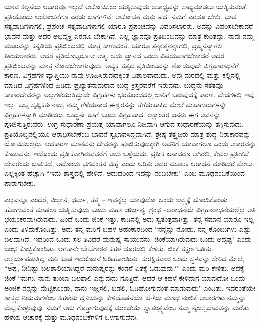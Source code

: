 ಯಾವ ಕಲ್ಪನೆಯ ಆಧಾರವೂ ಇಲ್ಲದೆ ಆಲೋಚಿಸಲು ಯತ್ನಿಸುವುದು ಅಸಾಧ್ಯವನ್ನು ಸಾಧ್ಯಮಾಡಲು ಯತ್ನಿಸುವಂತೆ. ಪ್ರತಿಯೊಂದು ಆಲೋಚನೆಗೂ ಎರಡು ಭಾಗಗಳಿವೆ: ಆಲೋಚನೆ ಮತ್ತು ಪದ. ನಮಗೆ ಎರಡೂ ಬೇಕು. ಭಾವ ಸತ್ಯವಾದಿಗಳಾಗಲಿ, ಪ್ರಪಂಚ–ಸತ್ಯವಾದಿಗಳಾಗಲಿ ಯಾರೂ ಪ್ರಪಂಚವನ್ನು ವಿವರಿಸಲಾರರು. ಅದನ್ನು ವಿವರಿಸಬೇಕಾದರೆ ಭಾವನೆ ಮತ್ತು ಅದರ ಅಭಿವ್ಯಕ್ತಿ ಎರಡೂ ಬೇಕಾಗಿವೆ. ಎಲ್ಲ ಜ್ಞಾನವೂ ಪ್ರತಿಬಿಂಬವನ್ನು ಮಾತ್ರ ಕುರಿತದ್ದು, ನಾವು ನಮ್ಮ ಮುಖವನ್ನು ಕನ್ನಡಿಯ ಪ್ರತಿಬಿಂಬದಲ್ಲಿ ಮಾತ್ರ ಕಾಣುವಂತೆ. ಯಾರೂ ತನ್ನಾತ್ಮನನ್ನಾಗಲಿ, ಬ್ರಹ್ಮನನ್ನಾಗಲಿ ತಿಳಿಯಲಾರರು. ಆದರೆ ಪ್ರತಿಯೊಬ್ಬರೂ ಆ ಆತ್ಮ. ಅದು ಜ್ಞಾನದ ಒಂದು ವಿಷಯವಾಗಬೇಕಾದರೆ ಅದರ ಪ್ರತಿಬಿಂಬವನ್ನು ಮಾತ್ರ ನೋಡಬೇಕಾಗುವುದು. ಅವ್ಯಕ್ತ ತತ್ವದ ಪ್ರತಿಬಿಂಬವನ್ನು ನೋಡುವುದೇ ವಿಗ್ರಹಾರಾಧನೆಗೆ ಕಾರಣ. ವಿಗ್ರಹಗಳ ವ್ಯಾಪ್ತಿಯು ನಾವು ಊಹಿಸಿರುವುದಕ್ಕಿಂತ ವಿಶಾಲವಾದುದು. ಅವು ಮರದಲ್ಲಿ ಮತ್ತು ಕಲ್ಲಿನಲ್ಲಿ ಮಾಡಿದ ವಿಗ್ರಹಗಳಿಂದ ಹಿಡಿದು ಪ್ರಖ್ಯಾತನಾಮರಾದ ಬುದ್ಧ ಕ್ರಿಸ್ತರವರೆಗೆ ಇರುವುವು. ಬುದ್ಧನು ಸತತವೂ ಸಾಕಾರದೇವರನ್ನು ಅಲ್ಲಗಳೆಯುತ್ತಿದ್ದುದೇ ವಿಗ್ರಹಗಳು ಭರತಖಂಡದಲ್ಲಿ ಜಾರಿಗೆ ಬರುವುದಕ್ಕೆ ಕಾರಣ. ವೇದಗಳಲ್ಲಿ ಇವು ಇಲ್ಲ. ಒಬ್ಬ ಸೃಷ್ಟಿಕರ್ತನಾದ, ನಮ್ಮ ಗೆಳೆಯನಾದ ಈಶ್ವರನನ್ನು ತೆಗೆದುಹಾಕಿದ ಮೇಲೆ ಮಹಾಗುರುಗಳನ್ನೇ ವಿಗ್ರಹಗಳನ್ನಾಗಿ ಮಾಡಿದರು. ಬುದ್ಧನೇ ಹಾಗೆ ಒಂದು ವಿಗ್ರಹವಾದ. ಲಕ್ಷಾಂತರ ಜನರು ಈಗ ಅವನನ್ನು ಪೂಜಿಸುತ್ತಿರುವರು. ಉಗ್ರ ಸುಧಾರಣಾ ಪ್ರಯತ್ನ ಯಾವಾಗಲೂ ನಿಜವಾಗಿ ಆಗುವ ಸುಧಾರಣೆಯನ್ನು ತಗ್ಗಿಸುವುದು. ಪ್ರತಿಯೊಬ್ಬನಲ್ಲಿಯೂ ಆರಾಧಿಸಬೇಕೆಂಬ ಭಾವನೆ ಸ್ವಭಾವಸಿದ್ಧವಾಗಿದೆ. ಶ್ರೇಷ್ಠ ತತ್ತ್ವಜ್ಞರು ಮಾತ್ರ ಶುದ್ಧ ನಿರಾಕಾರವನ್ನು ಯೋಚಿಸಬಲ್ಲರು. ಆದಕಾರಣ ಮಾನವನು ದೇವರನ್ನು ಪೂಜಿಸುವುದಕ್ಕಾಗಿ ಅವನಿಗೆ ಯಾವಾಗಲೂ ಒಂದು ಆಕಾರವನ್ನು ಕೊಡುವನು. ಇದೊಂದು ಪ್ರತೀಕವಾಗಿರುವವರೆಗೆ ಅದು ಒಳ್ಳೆಯದು. ಪ್ರತೀಕ ಏನಾದರೂ ಆಗಿರಲಿ, ಕೇವಲ ಪ್ರತೀಕವೆ ದೇವರೆಂದು ಭಾವಿಸದೆ, ಅದೊಂದು ಭಗವಂತನ ಚಿಹ್ನೆ ಎಂದು ಅರಿತು ಅದರ ಮೂಲಕ ಆರಾಧನೆ ಮಾಡಿದರೆ ಮೇಲು. ಎಲ್ಲಕ್ಕಿಂತ ಹೆಚ್ಚಾಗಿ “ಇದು ಶಾಸ್ತ್ರದಲ್ಲಿ ಹೇಳಿದೆ. ಆದುದರಿಂದ ಇದನ್ನು ನಂಬಬೇಕು'' ಎಂಬ ಮೂಢನಂಬಿಕೆಯಿಂದ ಪಾರಾಗಬೇಕು.

ಎಲ್ಲವನ್ನೂ ಎಂದರೆ, ವಿಜ್ಞಾನ, ಧರ್ಮ, ತತ್ತ್ವ – ಇವನ್ನೆಲ್ಲ ಯಾವುದೋ ಒಂದು ಶಾಸ್ತ್ರಕ್ಕೆ ಹೊಂದಿಕೊಂಡು ಹೋಗುವಂತೆ ಮಾಡಲು ಯತ್ನಿಸುವುದು ಒಂದು ಮಹಾ ದೌರ್ಜನ್ಯ. ಗ್ರಂಥ –ಆರಾಧನೆಯೆ ವಿಗ್ರಹಾರಾಧನೆಯಲ್ಲೆಲ್ಲ ಅತಿ ಭಯಂಕರವಾಗಿರುವುದು. ಹಿಂದೆ ಒಂದು ಜಿಂಕೆ ಇತ್ತು. ಕಾಡಿನಲ್ಲಿ ಅದು ಸ್ವತಂತ್ರವಾಗಿತ್ತು. ತನ್ನ ಸಮಾನ ಯಾರೂ ಇಲ್ಲ ಎಂದು ತಿಳಿದುಕೊಂಡಿತ್ತು. ಅದು ತನ್ನ ಮರಿಗೆ ಬಹಳ ಅಹಂಕಾರದಿಂದ “ನನ್ನನ್ನು ನೋಡು, ನನ್ನ ಕೊಂಬುಗಳು ಎಷ್ಟು ಬಲವಾಗಿವೆ. ಇದರಿಂದ ಒಂದು ಸಲ ತಿವಿದರೆ ಮನುಷ್ಯ ಸಾಯುವನು. ಜಿಂಕೆಯಾಗಿರುವುದು ಒಂದು ಅದೃಷ್ಟ" ಎಂದು ಜಂಭ ಕೊಚ್ಚಿಕೊಂಡಿತು. ಆಗತಾನೇ ಬೇಟೆಗಾರರ ಕಹಳೆ ದೂರದಲ್ಲಿ ಕೇಳಿತು. ಜಿಂಕೆ ತಕ್ಷಣ ಓಡಿತು. ಆಶ್ಚರ್ಯಪಡುತ್ತಿದ್ದ ಮರಿ ಕೂಡ ಇದರೊಡನೆ ಓಡಿಹೋಯಿತು. ಸುರಕ್ಷಿತವಾದ ಒಂದು ಸ್ಥಳವನ್ನು ಸೇರಿದ ಮೇಲೆ, “ಅಪ್ಪ, ನೀನಿಷ್ಟು ಬಲಶಾಲಿಯಾಗಿದ್ದರೆ ಮನುಷ್ಯರನ್ನು ಕಂಡರೆ ಏತಕ್ಕೆ ಓಡುವುದು?'' ಎಂದು ಮರಿ ಕೇಳಿತು. ಅದಕ್ಕೆ ಜಿಂಕೆ “ಮಗು, ನಾನು ತುಂಬಾ ಬಲಶಾಲಿ ಎನ್ನುವುದು ಗೊತ್ತಿದೆ. ಆದರೆ ಆ ಕಹಳೆ ಕೇಳಿದಾಗ ಯಾವುದೋ ಒಂದು ಅಂಜಿಕೆ ನನ್ನನ್ನು ಮೆಟ್ಟಿಕೊಂಡು, ನಾನು ಇಚ್ಚಿಸಲಿ, ಬಿಡಲಿ, ಓಡಿಹೋಗುವಂತೆ ಮಾಡುವುದು" ಎಂದಿತು. ಇದರಂತೆಯೇ ಶಾಸ್ತ್ರದ ನಿಯಮಗಳೆಂಬ ಕಹಳೆಯ ಧ್ವನಿಯನ್ನು ಕೇಳಿದೊಡನೆಯೇ ಹಳೆಯ ಮೂಢ ನಂಬಿಕೆ ಆಚಾರಗಳು ನಮ್ಮನ್ನು ಮೆಟ್ಟಿಕೊಳ್ಳುವುವು. ನಮಗೆ ಅದು ಗೊತ್ತಾಗುವುದಕ್ಕೆ ಮುಂಚೆಯೇ ಸ್ವಾತಂತ್ರ್ಯವೆಂಬ ನಮ್ಮ ನೈಜಸ್ವಭಾವವನ್ನು ಮರೆತು ಹಳೆಯ ಆಚಾರಕ್ಕೆ ಮತ್ತು ಮೂಢನಂಬಿಕೆ\-ಗಳಿಗೆ ಒಳಗಾಗುವೆವು.

